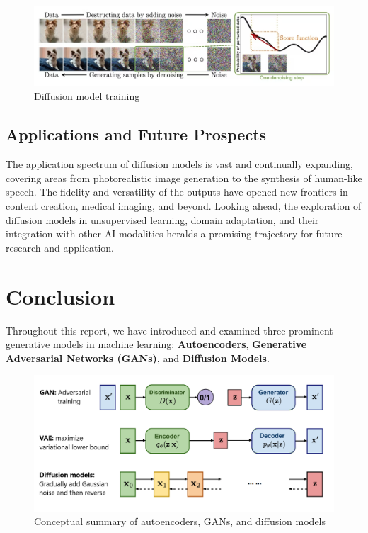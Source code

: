 \documentclass{article}
\begin{document}
			\begin{figure}[H]
				\centering
				\includegraphics[width=0.8\linewidth]{images/diffusion-training.jpg}
				\caption{Diffusion model training}
				\label{fig:diffusion-model-training}
			\end{figure}

		\subsection{Applications and Future Prospects}

			The application spectrum of diffusion models is vast and continually expanding, covering areas from photorealistic image generation to the synthesis of human-like speech. The fidelity and versatility of the outputs have opened new frontiers in content creation, medical imaging, and beyond. Looking ahead, the exploration of diffusion models in unsupervised learning, domain adaptation, and their integration with other AI modalities heralds a promising trajectory for future research and application.

		
		\section{Conclusion}

			Throughout this report, we have introduced and examined three prominent generative models in machine learning: \textbf{Autoencoders}, \textbf{Generative Adversarial Networks (GANs)}, and \textbf{Diffusion Models}.

			\begin{figure}[H]
				\centering
				\includegraphics[width=0.8\linewidth]{images/gan-vae-diffusin.png}
				\caption{Conceptual summary of autoencoders, GANs, and diffusion models}
				\label{fig:summary}
			\end{figure}
\end{document}

